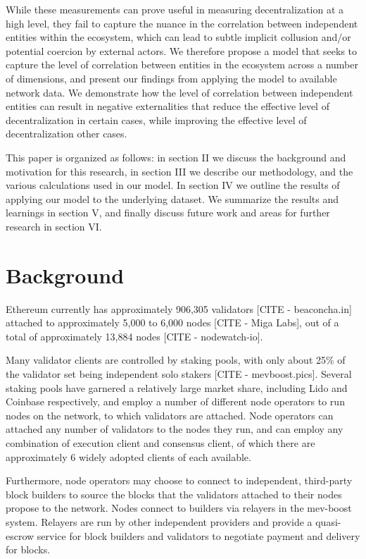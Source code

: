 \documentclass[conference]{IEEEtran}
\begin{document}
While these measurements can prove useful in measuring decentralization at a high level, they fail to capture the nuance in the correlation between independent entities within the ecosystem, which can lead to subtle implicit collusion and/or potential coercion by external actors.  We therefore propose a model that seeks to capture the level of correlation between entities in the ecosystem across a number of dimensions, and present our findings from applying the model to available network data.  We demonstrate how the level of correlation between independent entities can result in negative externalities that reduce the effective level of decentralization in certain cases, while improving the effective level of decentralization other cases.

This paper is organized as follows: in section II we discuss the background and motivation for this research, in section III we describe our methodology, and the various calculations used in our model.  In section IV we outline the results of applying our model to the underlying dataset.  We summarize the results and learnings in section V, and finally discuss future work and areas for further research in section VI.

\section{Background}

Ethereum currently has approximately 906,305 validators [CITE - beaconcha.in] attached to approximately 5,000 to 6,000 nodes [CITE - Miga Labs], out of a total of approximately 13,884 nodes [CITE - nodewatch-io].

Many validator clients are controlled by staking pools, with only about 25\% of the validator set being independent solo stakers [CITE - mevboost.pics].  Several staking pools have garnered a relatively large market share, including Lido and Coinbase respectively, and employ a number of different node operators to run nodes on the network, to which validators are attached.  Node operators can attached any number of validators to the nodes they run, and can employ any combination of execution client and consensus client, of which there are approximately 6 widely adopted clients of each available.

Furthermore, node operators may choose to connect to independent, third-party block builders to source the blocks that the validators attached to their nodes propose to the network. Nodes connect to builders via relayers in the mev-boost system.  Relayers are run by other independent providers and provide a quasi-escrow service for block builders and validators to negotiate payment and delivery for blocks.
\end{document}
